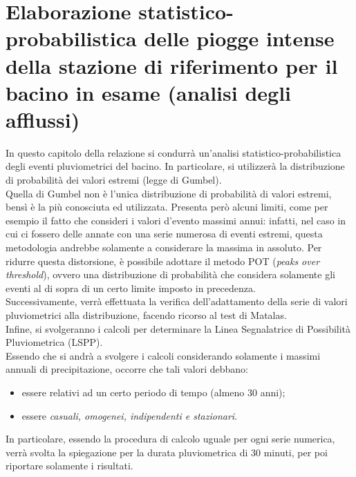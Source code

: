 \section{Elaborazione statistico-probabilistica delle piogge intense della stazione di riferimento per il bacino in esame (analisi degli afflussi)}
In questo capitolo della relazione si condurrà un'analisi statistico-probabilistica degli eventi pluviometrici del bacino. In particolare, si utilizzerà la distribuzione di probabilità dei valori estremi (legge di Gumbel).\\
Quella di Gumbel non è l'unica distribuzione di probabilità di valori estremi, bensì è la più conosciuta ed utilizzata. Presenta però alcuni limiti, come per esempio il fatto che consideri i valori d'evento massimi annui: infatti, nel caso in cui ci fossero delle annate con una serie numerosa di eventi estremi, questa metodologia andrebbe solamente a considerare la massima in assoluto. Per ridurre questa distorsione, è possibile adottare il metodo POT (\textit{peaks over threshold}), ovvero una distribuzione di probabilità che considera solamente gli eventi al di sopra di un certo limite imposto in precedenza.\\
Successivamente, verrà effettuata la verifica dell'adattamento della serie di valori pluviometrici alla distribuzione, facendo ricorso al test di Matalas.\\
Infine, si svolgeranno i calcoli per determinare la Linea Segnalatrice di Possibilità Pluviometrica (LSPP).\\
Essendo che si andrà a svolgere i calcoli considerando solamente i massimi annuali di precipitazione, occorre che tali valori debbano: 
\begin{itemize}
    \item essere relativi ad un certo periodo di tempo (almeno 30 anni);
    \item essere \textit{casuali, omogenei, indipendenti e stazionari}.
\end{itemize} 
In particolare, essendo la procedura di calcolo uguale per ogni serie numerica, verrà svolta la spiegazione per la durata pluviometrica di 30 minuti, per poi riportare solamente i risultati.

